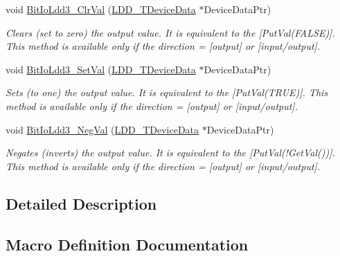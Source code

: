 \begin{DoxyCompactItemize}
void \hyperlink{group___bit_io_ldd3__module_gad1e5677bb374a68ea95ddac2e5b08503}{Bit\+Io\+Ldd3\+\_\+\+Clr\+Val} (\hyperlink{group___p_e___types__module_gac5cf1362f1f0e3a2ce71b1bf2276d091}{L\+D\+D\+\_\+\+T\+Device\+Data} $\ast$Device\+Data\+Ptr)
\begin{DoxyCompactList}\small\item\em Clears (set to zero) the output value. It is equivalent to the \mbox{[}Put\+Val(\+F\+A\+L\+S\+E)\mbox{]}. This method is available only if the direction = {\itshape \mbox{[}output\mbox{]}} or {\itshape \mbox{[}input/output\mbox{]}}. \end{DoxyCompactList}\item 
void \hyperlink{group___bit_io_ldd3__module_ga0db13c2a53c9dc14fa7f51701df5375c}{Bit\+Io\+Ldd3\+\_\+\+Set\+Val} (\hyperlink{group___p_e___types__module_gac5cf1362f1f0e3a2ce71b1bf2276d091}{L\+D\+D\+\_\+\+T\+Device\+Data} $\ast$Device\+Data\+Ptr)
\begin{DoxyCompactList}\small\item\em Sets (to one) the output value. It is equivalent to the \mbox{[}Put\+Val(\+T\+R\+U\+E)\mbox{]}. This method is available only if the direction = {\itshape \mbox{[}output\mbox{]}} or {\itshape \mbox{[}input/output\mbox{]}}. \end{DoxyCompactList}\item 
void \hyperlink{group___bit_io_ldd3__module_gaf2f93fab1bcb91f83a96805a4cdec84e}{Bit\+Io\+Ldd3\+\_\+\+Neg\+Val} (\hyperlink{group___p_e___types__module_gac5cf1362f1f0e3a2ce71b1bf2276d091}{L\+D\+D\+\_\+\+T\+Device\+Data} $\ast$Device\+Data\+Ptr)
\begin{DoxyCompactList}\small\item\em Negates (inverts) the output value. It is equivalent to the \mbox{[}Put\+Val(!\+Get\+Val())\mbox{]}. This method is available only if the direction = {\itshape \mbox{[}output\mbox{]}} or {\itshape \mbox{[}input/output\mbox{]}}. \end{DoxyCompactList}\end{DoxyCompactItemize}


\subsection{Detailed Description}


\subsection{Macro Definition Documentation}
\mbox{\label{group___bit_io_ldd3__module_ga571fcfe991c653c303926e95b884c718}} 
